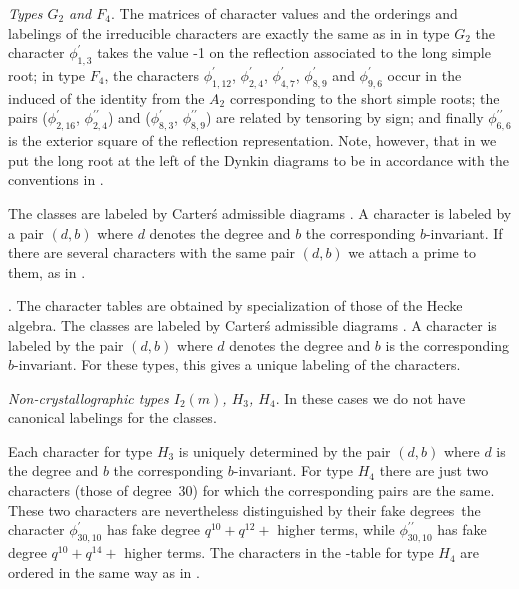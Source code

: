 \smallskip
{\em  Types  $G_2$  and  $F_4$}.  The  matrices of character values and the
orderings  and labelings of the irreducible characters are exactly the same
as in \cite[p.412/413]{Car85}\: in type $G_2$ the character
$\phi_{1,3}^\prime$  takes the value -1 on the reflection associated to the
long  simple  root;  in  type  $F_4$,  the characters $\phi_{1,12}^\prime$,
$\phi_{2,4}^\prime$,     $\phi_{4,7}^\prime$,    $\phi_{8,9}^\prime$    and
$\phi_{9,6}^\prime$  occur in  the induced  of the  identity from the $A_2$
corresponding  to the short simple  roots; the pairs ($\phi_{2,16}^\prime$,
$\phi_{2,4}^{\prime\prime}$) and ($\phi_{8,3}^\prime$,
$\phi_{8,9}^{\prime\prime}$)  are related by tensoring by sign; and finally
$\phi_{6,6}^{\prime\prime}$  is  the  exterior  square  of  the  reflection
representation.  Note, however, that  in {\CHEVIE} we  put the long root at
the left of the Dynkin diagrams to be in accordance with the conventions in
\cite[(4.8) and (4.10)]{Lus85}.

The  classes are labeled  by Carter\'s admissible  diagrams \cite{Car72}. A
character is labeled by a pair $(d,b)$ where $d$ denotes the degree and $b$
the  corresponding $b$-invariant. If there  are several characters with the
same pair $(d,b)$ we attach a prime to them, as in \cite{Car85}.

. The character tables are obtained by
specialization  of those of  the Hecke algebra.  The classes are labeled by
Carter\'s  admissible diagrams \cite{Car72}. A  character is labeled by the
pair  $(d,b)$ where  $d$ denotes  the degree  and $b$  is the corresponding
$b$-invariant.  For  these  types,  this  gives  a  unique  labeling of the
characters. 

\smallskip
{\em  Non-crystallographic types $I_2(m)$, $H_3$, $H_4$}. In these cases we
do not have canonical labelings for the classes.

Each  character for type  $H_3$ is uniquely  determined by the pair $(d,b)$
where  $d$ is the degree and  $b$ the corresponding $b$-invariant. For type
$H_4$  there are just  two characters (those  of degree~$30$) for which the
corresponding  pairs are  the same.  These two  characters are nevertheless
distinguished by their fake degrees\:\ the character
$\phi_{30,10}^\prime$  has  fake  degree  $q^{10}+q^{12}+$  higher terms,
while $\phi_{30,10}^{\prime\prime}$ has fake degree $q^{10}+q^{14}+$ higher
terms.  The characters in  the \CHEVIE-table for  type $H_4$ are ordered in
the same way as in \cite{AL82}.

